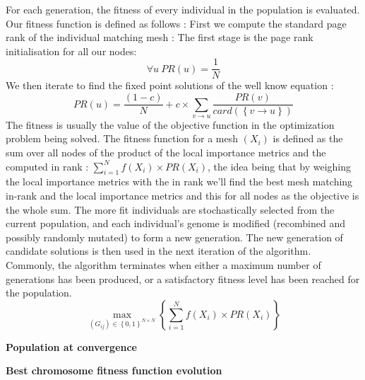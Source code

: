 \documentclass{iSWAGArticle}
\begin{document}
For each generation, the fitness of every individual in the population is evaluated. Our fitness function is defined as follows :
First we compute the standard page rank of the individual matching mesh :
The first stage is the page rank initialisation for all our nodes:
\begin{equation}
\forall u \ PR\left(u\right)=\frac{1}{N}
\end{equation} 
We then iterate to find the fixed point solutions of the well know equation :
\begin{equation}
PR\left(u\right)= \frac{\left(1-c\right)}{N} + c \times \sum_{v \rightarrow u}\frac{PR\left(v\right)}{card\left(\left\{v\rightarrow u\right\}\right)}
\end{equation}
The fitness is usually the value of the objective function in the optimization problem being solved.
The fitness function for a mesh $\left(X_i\right)$ is defined as the sum over all nodes of the product of the local importance metrics
and the computed in rank : $\sum^{N}_{i=1} f\left(X_i\right)\times PR(X_i)$, the idea being that by weighing the local importance metrics with the in rank
we'll find the best mesh matching in-rank and the local importance metrics and this for all nodes as the objective is the whole sum.  The more fit individuals are stochastically selected from the current population, 
and each individual's genome is modified (recombined and possibly randomly mutated) to form a new generation. 
The new generation of candidate solutions is then used in the next iteration of the algorithm. 
Commonly, the algorithm terminates when either a maximum number of generations has been produced, 
or a satisfactory fitness level has been reached for the population.
\begin{equation}
\max_{\left(G_{ij}\right)  \in \left\{0,1\right\}^{N\times N}}\left\{ \sum^{N}_{i=1} f\left(X_i\right)\times PR(X_i)\right\}
\end{equation}

\begin{center}
\textbf{\large Population at convergence}
\end{center}
\begin{center}
\end{center}

\begin{center}
\textbf{\large Best chromosome fitness function evolution}
\end{center}
\begin{center}
\end{center}
\end{document}
